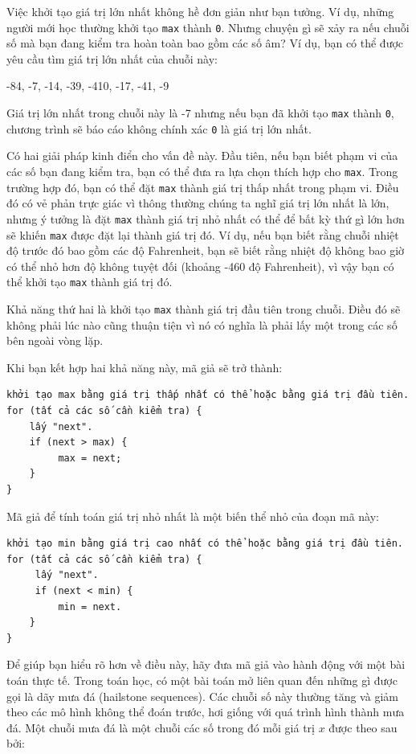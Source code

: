 Việc khởi tạo giá trị lớn nhất không hề đơn giản như bạn tưởng. Ví dụ,
những người mới học thường khởi tạo \texttt{max} thành \texttt{0}. Nhưng
chuyện gì sẽ xảy ra nếu chuỗi số mà bạn đang kiểm tra hoàn toàn bao gồm
các số âm? Ví dụ, bạn có thể được yêu cầu tìm giá trị lớn nhất của chuỗi
này:

-84, -7, -14, -39, -410, -17, -41, -9

Giá trị lớn nhất trong chuỗi này là -7 nhưng nếu bạn đã khởi tạo
\texttt{max} thành \texttt{0}, chương trình sẽ báo cáo không chính xác
\texttt{0} là giá trị lớn nhất.

Có hai giải pháp kinh điển cho vấn đề này. Đầu tiên, nếu bạn biết phạm
vi của các số bạn đang kiểm tra, bạn có thể đưa ra lựa chọn thích hợp
cho \texttt{max}. Trong trường hợp đó, bạn có thể đặt \texttt{max} thành
giá trị thấp nhất trong phạm vi. Điều đó có vẻ phản trực giác vì thông
thường chúng ta nghĩ giá trị lớn nhất là lớn, nhưng ý tưởng là đặt
\texttt{max} thành giá trị nhỏ nhất có thể để bất kỳ thứ gì lớn hơn sẽ
khiến \texttt{max} được đặt lại thành giá trị đó. Ví dụ, nếu bạn biết
rằng chuỗi nhiệt độ trước đó bao gồm các độ Fahrenheit, bạn sẽ biết rằng
nhiệt độ không bao giờ có thể nhỏ hơn độ không tuyệt đối (khoảng -460 độ
Fahrenheit), vì vậy bạn có thể khởi tạo \texttt{max} thành giá trị đó.

Khả năng thứ hai là khởi tạo \texttt{max} thành giá trị đầu tiên trong
chuỗi. Điều đó sẽ không phải lúc nào cũng thuận tiện vì nó có nghĩa là
phải lấy một trong các số bên ngoài vòng lặp.

Khi bạn kết hợp hai khả năng này, mã giả sẽ trở thành:

\begin{verbatim}
khởi tạo max bằng giá trị thấp nhất có thể hoặc bằng giá trị đầu tiên.
for (tất cả các số cần kiểm tra) {
    lấy "next".
    if (next > max) {
         max = next;
    }
}
\end{verbatim}

Mã giả để tính toán giá trị nhỏ nhất là một biến thể nhỏ của đoạn mã
này:

\begin{verbatim}
khởi tạo min bằng giá trị cao nhất có thể hoặc bằng giá trị đầu tiên.
for (tất cả các số cần kiểm tra) {
     lấy "next".
     if (next < min) {
         min = next.
    }
}
\end{verbatim}

Để giúp bạn hiểu rõ hơn về điều này, hãy đưa mã giả vào hành động với
một bài toán thực tế. Trong toán học, có một bài toán mở liên quan đến
những gì được gọi là dãy mưa đá (hailstone sequences). Các chuỗi số này
thường tăng và giảm theo các mô hình không thể đoán trước, hơi giống với
quá trình hình thành mưa đá. Một chuỗi mưa đá là một chuỗi các số trong
đó mỗi giá trị \(x\) được theo sau bởi:

